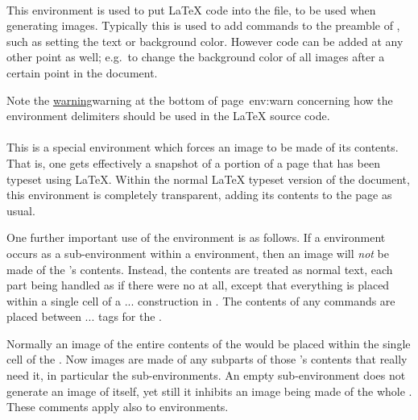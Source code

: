 \htmlrule[width=300]
%
%
\paragraph*{\label{imagesonly}}
This environment is used to put \LaTeX{} code into the  file,
to be used when generating images. Typically this is used to add commands to
the preamble of , such as setting the text or background color.
However code can be added at any other point as well; 
e.g.\ to change the background color of all images after a certain point in the document. 

\smallskip\noindent
Note the \hyperref[page]{warning}{warning at the bottom of page~}{}{env:warn}
concerning how the environment delimiters should be used in the
\LaTeX{} source code.


%
%
\paragraph*{\label{makeimage}}
This is a special environment which forces an image to be made of its contents.
That is, one gets effectively a snapshot of a portion of a page
that has been typeset using \LaTeX. 
Within the normal \LaTeX{} typeset version of the document, this environment 
is completely transparent, adding its contents to the page as usual.

\html{\\}%
One further important use of the  environment is as follows.
If a  environment occurs as a sub-environment within 
a  environment, then an image will \emph{not} be made of the
's contents. Instead, the contents are treated as normal text,
each part being handled as if there were no  at all,
except that everything is placed within a single cell of a
... construction in \HTMLiii. 
The contents of any 
commands are placed between ... tags 
for the .

\html{\\}%
Normally an image of the entire contents of the  would be
placed within the single cell of the .
Now images are made of any subparts of those 's contents 
that really need it, in particular the  sub-environments.
An empty  sub-environment does not generate an image of itself,
yet still it inhibits an image being made of the whole .
These comments apply also to  environments.



